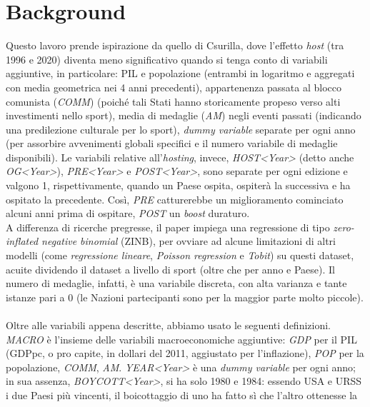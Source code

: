 \section{Background}\label{sec:background}

Questo lavoro prende ispirazione da quello di
Csurilla\cite{csurillaLessObviousEffect2023}, dove l'effetto \textit{host} (tra
1996 e 2020) diventa meno significativo quando si tenga conto di variabili
aggiuntive, in particolare: PIL e popolazione (entrambi in logaritmo e aggregati
con media geometrica nei 4 anni precedenti), appartenenza passata al blocco
comunista (\textit{COMM}) (poiché tali Stati hanno storicamente propeso verso
alti investimenti nello sport\cite{tobit1comm1,tobit3comm2,comm3,comm4}), media
di medaglie (\textit{AM}) negli eventi passati (indicando una predilezione
culturale per lo sport), \textit{dummy variable} separate per ogni anno (per
assorbire avvenimenti globali specifici e il numero variabile di medaglie
disponibili). Le variabili relative all'\textit{hosting}, invece,
\textit{HOST<Year>} (detto anche \textit{OG<Year>}), \textit{PRE<Year>} e
\textit{POST<Year>}, sono separate per ogni edizione e valgono 1,
rispettivamente, quando un Paese ospita, ospiterà la successiva e ha ospitato la
precedente. Così, \textit{PRE} catturerebbe un miglioramento cominciato alcuni
anni prima di ospitare, \textit{POST} un \textit{boost} duraturo.\\
A differenza di ricerche pregresse, il paper impiega una regressione di tipo
\textit{zero-inflated negative binomial} (ZINB), per ovviare ad alcune
limitazioni di altri modelli (come \textit{regressione lineare}, \textit{Poisson
regression} e
\textit{Tobit}\cite{tobit1comm1,tobit2,tobit3comm2,tobit4,tobit5,tobit6}) su
questi dataset, acuite dividendo il dataset a livello di sport (oltre che per
anno e Paese). Il numero di medaglie, infatti, è una variabile discreta, con
alta varianza e tante istanze pari a 0 (le Nazioni partecipanti sono per la
maggior parte molto piccole).\\
\\
Oltre alle variabili appena descritte, abbiamo usato le seguenti definizioni.
\textit{MACRO} è l'insieme delle variabili macroeconomiche aggiuntive:
\textit{GDP} per il PIL (GDPpc, o pro capite, in dollari del 2011, aggiustato
per l'inflazione), \textit{POP} per la popolazione, \textit{COMM}, \textit{AM}.
\textit{YEAR<Year>} è una \textit{dummy variable} per ogni anno; in sua assenza,
\textit{BOYCOTT<Year>}, si ha solo 1980 e 1984: essendo USA e URSS i due Paesi
più vincenti, il boicottaggio di uno ha fatto sì che l'altro ottenesse la
